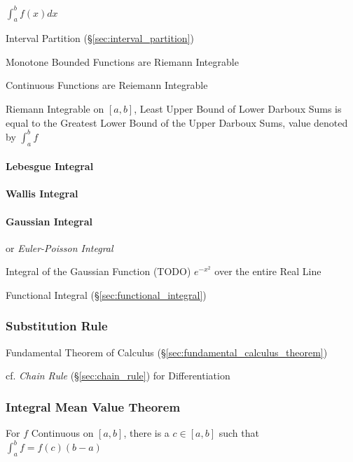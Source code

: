 $\int_a^b f(x) dx$

Interval Partition (\S\ref{sec:interval_partition})

Monotone Bounded Functions are Riemann Integrable

Continuous Functions are Reiemann Integrable

Riemann Integrable on $[a,b]$, Least Upper Bound of Lower Darboux Sums
is equal to the Greatest Lower Bound of the Upper Darboux Sums, value
denoted by $\int_a^b f$



\paragraph{Lebesgue Integral}\label{sec:lebesgue_integral}\hfill

\paragraph{Wallis Integral}\label{sec:wallis_integral}\hfill

\paragraph{Gaussian Integral}\label{sec:gaussian_integral}\hfill

or \emph{Euler-Poisson Integral}

Integral of the Gaussian Function (TODO) $e^{-x^2}$ over the entire Real Line

\fist Functional Integral (\S\ref{sec:functional_integral})



\subsubsection{Substitution Rule}\label{sec:substitution_rule}

Fundamental Theorem of Calculus (\S\ref{sec:fundamental_calculus_theorem})

\fist cf. \emph{Chain Rule} (\S\ref{sec:chain_rule}) for Differentiation



\subsubsection{Integral Mean Value Theorem}
\label{sec:integral_mean_value}

For $f$ Continuous on $[a,b]$, there is a $c \in [a,b]$ such that
$\int_a^b f = f(c)(b - a)$



